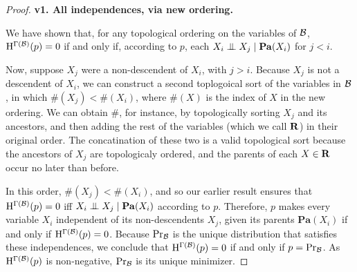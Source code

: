 \documentclass{article}
\def\Pa{\mathbf{Pa}}
\begin{document}
\begin{proof}
	\textbf{v1. All independences, via new ordering.}
	
	We have shown that, for any topological ordering on the variables of $\cal B$, $\mathrm{H}^{\Gamma(\cal B)}(p) = 0$ if and only if, according to $p$,  each $X_i \CI X_j \mid \Pa(X_i)$ for $j  < i$. 
	
	Now, suppose $X_j$ were a non-descendent of $X_i$, with $j > i$. Because $X_j$ is not a descendent of $X_i$, we can construct a second toplogoical sort of the variables in $\cal B$, in which $\#(X_j) < \#(X_i)$, where $\#(X)$ is the index of $X$ in the new ordering. 
	We can obtain $\#$, for instance, by topologically sorting $X_j$ and its ancestors, and then adding the rest of the variables (which we call $\bf R$) in their original order. The concatination of these two is a valid topological sort because the ancestors of $X_j$ are topologicaly ordered, and the parents of each $X \in \bf R$ occur no later than before.
	
	
	In this order, $\#(X_j) < \#(X_i)$, and so our earlier result ensures that  $\mathrm{H}^{\Gamma(\cal B)}(p) = 0$ iff $X_i \CI X_j \mid \Pa(X_i)$ according to $p$. Therefore, $p$ makes every variable $X_i$ independent of its non-descendents $X_j$, given its parents $\Pa(X_i)$ if and only if $\mathrm{H}^{\Gamma(\cal B)}(p) = 0$. 
	Because $\Pr_{\cal B}$ is the unique distribution that satisfies these independences, we conclude that $\mathrm{H}^{\Gamma(\cal B)}(p) = 0$ if and only if $p = \Pr_{\cal B}$. 	
	As $\mathrm{H}^{\Gamma(\cal B)}(p)$ is non-negative, $\Pr_{\cal B}$ is its unique minimizer. 

	

\end{proof}
\end{document}
